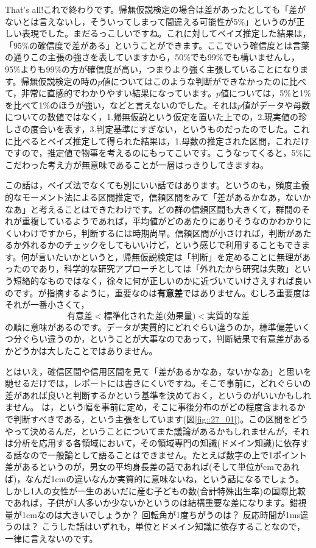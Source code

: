 \documentclass{ltjbook}
\begin{document}
That's all!これで終わりです。帰無仮説検定の場合は差があったとしても「差がないとは言えないし，そういってしまって間違える可能性が5\%」というのが正しい表現でした。まだるっこしいですね。これに対してベイズ推定した結果は，「95\%の確信度で差がある」ということができます。ここでいう確信度とは言葉の通りこの主張の強さを表していますから，50\%でも99\%でも構いませんし，95\%よりも99\%の方が確信度が高い，つまりより強く主張していることになります。帰無仮説検定の時の$p$値についてはこのような判断ができなかったのに比べて，非常に直感的でわかりやすい結果になっています。$p$値については，5\%と1\% を比べて1\%のほうが強い，などと言えないのでした。それは$p$値がデータや母数についての数値ではなく，1.帰無仮説という仮定を置いた上での，2.現実値の珍しさの度合いを表す，3.判定基準にすぎない，というものだったのでした。これに比べるとベイズ推定して得られた結果は，1.母数の推定された区間，これだけですので，推定値で物事を考えるのにもってこいです。こうなってくると，5\%にこだわった考え方が無意味であることが一層はっきりしてきますね。

この話は，ベイズ法でなくても別にいい話ではあります。というのも，頻度主義的なモーメント法による区間推定で，信頼区間をみて「差があるかなあ，ないかなあ」と考えることはできたわけです。どの群の信頼区間も大きくて，群間のそれが重複しているようであれば，平均値がどのあたりにありそうなのかわかりにくいわけですから，判断するには時期尚早。信頼区間が小さければ，判断があたるか外れるかのチェックをしてもいいけど，という感じで利用することもできます。何が言いたいかというと，帰無仮説検定は「判断」を定めることに無理があったのであり，科学的な研究アプローチとしては「外れたから研究は失敗」という短絡的なものではなく，徐々に何が正しいのかに近づいていけさえすれば良いのです。\textcite{Toyoda2009}が指摘するように，重要なのは\textbf{有意差}ではありません。むしろ重要度はそれが一番小さくて，
\[ \mbox{有意差} < \mbox{標準化された差(効果量)} < \mbox{実質的な差} \]
の順に意味があるのです。データが実質的にどれぐらい違うのか，標準偏差いくつ分ぐらい違うのか，ということが大事なのであって，判断結果で有意差があるかどうかは大したことではありません。

とはいえ，確信区間や信用区間を見て「差があるかなあ，ないかなあ」と思いを馳せるだけでは，レポートには書きにくいですね。そこで事前に，どれぐらいの差があれば良いと判断するかという基準を決めておく，というのがいいかもしれません。
\textcite{kruschke2018rejecting}は，という幅を事前に定め，そこに事後分布のがどの程度含まれるかで判断すべきである，という主張をしています(図\ref{fig::27_01})。この区間をどうやって決めるんだ，ということについてまた議論があるかもしれませんが，それは分析を応用する各領域において，その領域専門の知識(ドメイン知識)に依存する話なので一般論として語ることはできません。たとえば数字の上で1ポイント差があるというのが，男女の平均身長差の話であれば(そして単位がcmであれば)，なんだ1cmの違いなんか実質的に意味ないね，という話になるでしょう。しかし1人の女性が一生のあいだに産む子どもの数(合計特殊出生率)の国際比較であれば，子供が1人多いか少ないかというのは結構重要な差になります。錯視量が1cmなのは大きいでしょうか？ 回転角が1度ちがうのは？ 反応時間が1ms違うのは？ こうした話はいずれも，単位とドメイン知識に依存することなので，一律に言えないのです。
\end{document}
